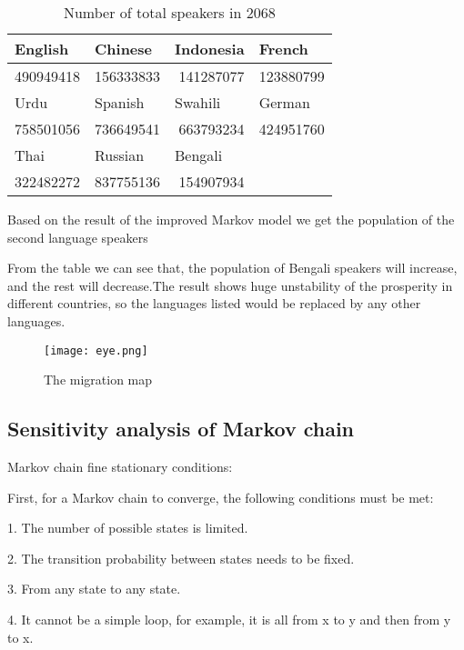 \documentclass[12pt]{article}  %
\begin{document}
\begin{table}[htbp]
	\centering
	\caption{Number of total speakers in 2068 }
	\begin{tabular}{rrrr}
		\toprule
		\multicolumn{1}{l}{English} & \multicolumn{1}{l}{Chinese} & \multicolumn{1}{l}{Indonesia} & \multicolumn{1}{l}{French} \\
		\midrule
		490949418 & 156333833 & 141287077 & 123880799 \\
		\midrule
		\multicolumn{1}{l}{Urdu} & \multicolumn{1}{l}{Spanish} & \multicolumn{1}{l}{Swahili} & \multicolumn{1}{l}{German} \\
		\midrule
		758501056 & 736649541 & 663793234 & 424951760 \\
		\midrule
		\multicolumn{1}{l}{Thai} & \multicolumn{1}{l}{Russian} & \multicolumn{1}{l}{Bengali} &  \\
		\midrule
		322482272 & 837755136 & 154907934 &  \\
		\bottomrule
	\end{tabular}%
	\label{tab:addlabel}%
\end{table}%
Based on the result of the improved Markov model we get the population of the
second language speakers

From the table we can see that, the population of Bengali speakers will increase, and
the rest will decrease.The result shows huge unstability of the prosperity in different
countries, so the languages listed would be replaced by any other languages.

\begin{figure}[H]
	\centering
	\texttt{[image: eye.png]}
	\caption{The migration map}\label{fig:eye}
\end{figure}
\subsection{Sensitivity analysis of Markov chain}
Markov chain fine stationary conditions:

First, for a Markov chain to converge, the following conditions must be met:

1. The number of possible states is limited.

2. The transition probability between states needs to be fixed.

3. From any state to any state.

4. It cannot be a simple loop, for example, it is all from x to y and then from y to x.
\end{document}
